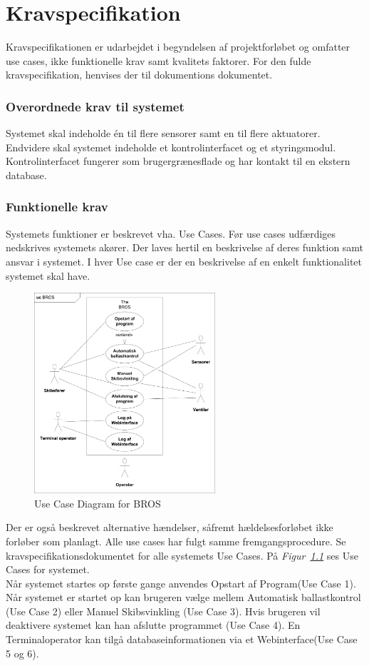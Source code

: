\chapter{Kravspecifikation}
\label{ch:kravspecikikation}
Kravspecifikationen er udarbejdet i begyndelsen af projektforløbet og omfatter use cases, ikke funktionelle krav samt kvalitets faktorer. For den fulde kravspecifikation, henvises der til dokumentions dokumentet.

\subsection{Overordnede krav til systemet}
Systemet skal indeholde én til flere sensorer samt en til flere aktuatorer. Endvidere skal systemet indeholde et kontrolinterfacet og et styringsmodul. Kontrolinterfacet fungerer som brugergrænesflade og har kontakt til en ekstern database.

\subsection{Funktionelle krav}
Systemets funktioner er beskrevet vha. Use Cases. Før use cases udfærdiges nedskrives systemets akører. Der laves hertil en beskrivelse af deres funktion samt ansvar i systemet. I hver Use case er der en beskrivelse af en enkelt funktionalitet systemet skal have.
\begin{figure}[H]
\centering
\includegraphics[width=0.6\textwidth]{billeder/UCDBROS}
\caption{Use Case Diagram for BROS}
\label{fig:UCDBROS}
\end{figure}
Der er også beskrevet alternative hændelser, såfremt hældelsesforløbet ikke forløber som planlagt. Alle use cases har fulgt samme fremgangsprocedure. Se kravspecifikationsdokumentet for alle systemets Use Cases. På \textit{Figur~\ref{fig:UCDBROS}} ses Use Cases for systemet.\\
Når systemet startes op første gange anvendes Opstart af Program(Use Case 1). Når systemet er startet op kan brugeren vælge mellem Automatisk ballastkontrol (Use Case 2) eller Manuel Skibsvinkling (Use Case 3). Hvis brugeren vil deaktivere systemet kan han afslutte programmet (Use Case 4). En Terminaloperator kan tilgå databaseinformationen via et Webinterface(Use Case 5 og 6).


